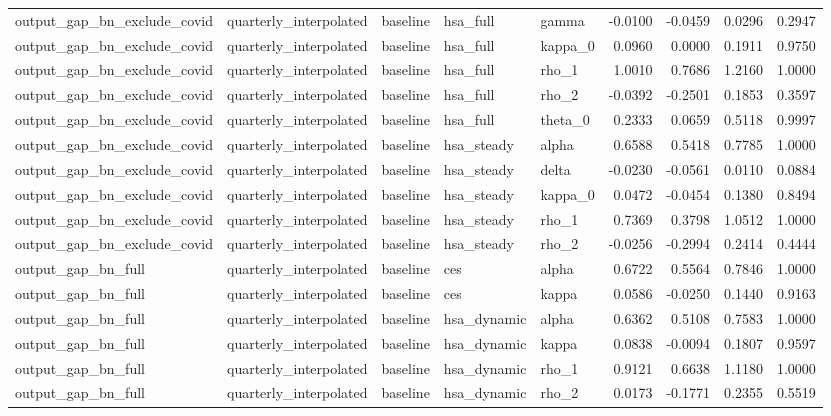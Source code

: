 \begin{tabular}{lllllrrrr}
output\_gap\_bn\_exclude\_covid & quarterly\_interpolated & baseline & hsa\_full & gamma & -0.0100 & -0.0459 & 0.0296 & 0.2947 \\
output\_gap\_bn\_exclude\_covid & quarterly\_interpolated & baseline & hsa\_full & kappa\_0 & 0.0960 & 0.0000 & 0.1911 & 0.9750 \\
output\_gap\_bn\_exclude\_covid & quarterly\_interpolated & baseline & hsa\_full & rho\_1 & 1.0010 & 0.7686 & 1.2160 & 1.0000 \\
output\_gap\_bn\_exclude\_covid & quarterly\_interpolated & baseline & hsa\_full & rho\_2 & -0.0392 & -0.2501 & 0.1853 & 0.3597 \\
output\_gap\_bn\_exclude\_covid & quarterly\_interpolated & baseline & hsa\_full & theta\_0 & 0.2333 & 0.0659 & 0.5118 & 0.9997 \\
output\_gap\_bn\_exclude\_covid & quarterly\_interpolated & baseline & hsa\_steady & alpha & 0.6588 & 0.5418 & 0.7785 & 1.0000 \\
output\_gap\_bn\_exclude\_covid & quarterly\_interpolated & baseline & hsa\_steady & delta & -0.0230 & -0.0561 & 0.0110 & 0.0884 \\
output\_gap\_bn\_exclude\_covid & quarterly\_interpolated & baseline & hsa\_steady & kappa\_0 & 0.0472 & -0.0454 & 0.1380 & 0.8494 \\
output\_gap\_bn\_exclude\_covid & quarterly\_interpolated & baseline & hsa\_steady & rho\_1 & 0.7369 & 0.3798 & 1.0512 & 1.0000 \\
output\_gap\_bn\_exclude\_covid & quarterly\_interpolated & baseline & hsa\_steady & rho\_2 & -0.0256 & -0.2994 & 0.2414 & 0.4444 \\
output\_gap\_bn\_full & quarterly\_interpolated & baseline & ces & alpha & 0.6722 & 0.5564 & 0.7846 & 1.0000 \\
output\_gap\_bn\_full & quarterly\_interpolated & baseline & ces & kappa & 0.0586 & -0.0250 & 0.1440 & 0.9163 \\
output\_gap\_bn\_full & quarterly\_interpolated & baseline & hsa\_dynamic & alpha & 0.6362 & 0.5108 & 0.7583 & 1.0000 \\
output\_gap\_bn\_full & quarterly\_interpolated & baseline & hsa\_dynamic & kappa & 0.0838 & -0.0094 & 0.1807 & 0.9597 \\
output\_gap\_bn\_full & quarterly\_interpolated & baseline & hsa\_dynamic & rho\_1 & 0.9121 & 0.6638 & 1.1180 & 1.0000 \\
output\_gap\_bn\_full & quarterly\_interpolated & baseline & hsa\_dynamic & rho\_2 & 0.0173 & -0.1771 & 0.2355 & 0.5519 \\

\end{tabular}
